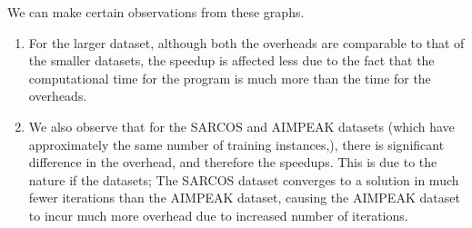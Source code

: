 \documentclass[12pt]{article}
\begin{document}
\newline\newline
We can make certain observations from these graphs.
\begin{enumerate}[label=(\alph*)]
\item For the larger dataset, although both the overheads are comparable to that of the smaller datasets, the speedup is affected less due to the fact that the computational time for the program is much more than the time for the overheads.
\item We also observe that for the SARCOS and AIMPEAK datasets (which have approximately the same number of training instances,), there is significant difference in the overhead, and therefore the speedups. This is due to the nature if the datasets; The SARCOS dataset converges to a solution in much fewer iterations than the AIMPEAK dataset, causing the AIMPEAK dataset to incur much more overhead due to increased number of iterations.
\end{enumerate}
\end{document}
